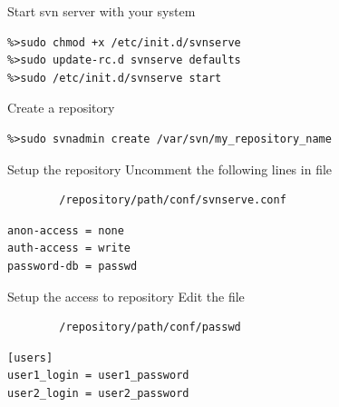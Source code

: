 \documentclass[12pt]{beamer}
\begin{document}
\begin{frame}[fragile]
	\begin{block}{Start svn server with your system}
		\begin{verbatim}
%>sudo chmod +x /etc/init.d/svnserve
%>sudo update-rc.d svnserve defaults
%>sudo /etc/init.d/svnserve start
		\end{verbatim}
	\end{block}
\end{frame}

\begin{frame}[fragile]
	\begin{block}{Create a repository}
		\begin{verbatim}
%>sudo svnadmin create /var/svn/my_repository_name
		\end{verbatim}
	\end{block}
	\begin{block}{Setup the repository}
		Uncomment the following lines in file 
		\begin{verbatim}
		/repository/path/conf/svnserve.conf
		\end{verbatim}
		\hline
		\begin{verbatim}
anon-access = none
auth-access = write
password-db = passwd
		\end{verbatim}
	\end{block}
	\begin{block}{Setup the access to repository}
		Edit the file 
		\begin{verbatim}
		/repository/path/conf/passwd
		\end{verbatim}
		\hline
		\begin{verbatim}
[users]
user1_login = user1_password
user2_login = user2_password
		\end{verbatim}
	\end{block}
\end{frame}

\end{document}
